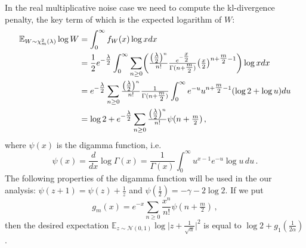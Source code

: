 \documentclass[a4paper,10pt]{article}
\begin{document}
In the real multiplicative noise case we need to compute the kl-divergence penalty, the key
term of which is the expected logarithm of $W$:
\begin{align}
\mathbb{E}_{W\sim \chi^2_m(\lambda)} \log W
  &= \int_0^\infty f_W(x) \log x dx
  \notag \\
  &= \frac12 e^{- \tfrac\lambda2}
  \int_0^\infty \sum_{n \geq 0} \biggl(
      \tfrac{\bigl(\tfrac\lambda2\bigr)^n}{n!}
      \tfrac{e^{- \tfrac{x}2}}{\Gamma(n + \tfrac{m}2)}
      \bigl(\tfrac{x}2\bigr)^{n + \tfrac{m}2 - 1}
  \biggr) \log x dx
  \notag \\
  &= e^{- \tfrac\lambda2} \sum_{n \geq 0}
      \tfrac{\bigl(\tfrac\lambda2\bigr)^n}{n!}
  \tfrac1{\Gamma(n + \tfrac{m}2)}
  \int_0^\infty
      e^{- u} u^{n + \tfrac{m}2 - 1}
      (\log2 + \log u) du
  \notag \\
  &= \log{2}
  + e^{- \tfrac\lambda2} \sum_{n \geq 0}
      \tfrac{\bigl(\tfrac\lambda2\bigr)^n}{n!}
      \psi(n + \tfrac{m}2)
  \,,
\end{align}
where $\psi(x)$ is the digamma function, i.e.
$$
\psi(x)
  = \frac{d}{dx} \log \Gamma(x)
  = \frac1{\Gamma(x)}
    \int_0^\infty
      u^{x-1} e^{-u} \log{u}
    \, du
  \,. $$
The following properties of the digamma function will be used in the our analysis:
$
  \psi(z+1) = \psi(z) + \tfrac1z
$ and $
  \psi(\tfrac12) = -\gamma - 2\log 2
$. If we put
$$
g_m(x)
  = e^{-x} \sum_{n \geq 0} \frac{x^n}{n!} \psi(n + \tfrac{m}2)
  \,, $$
then the desired expectation $
  \mathbb{E}_{z \sim \mathcal{N}(0, 1)}
    \log{\bigl\lvert z + \tfrac1{\sqrt{\alpha}} \bigr\rvert^2}
$ is equal to $
  \log{2} + g_1(\tfrac1{2\alpha})
$.
\end{document}

